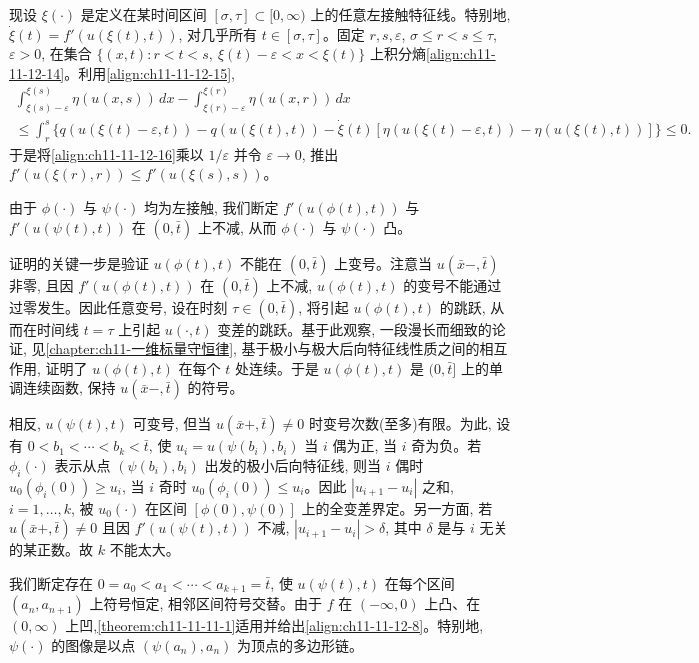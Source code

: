 \documentclass[../../main.tex]{subfiles}
\begin{document}
现设 $\xi(\cdot)$ 是定义在某时间区间 $[\sigma,\tau]\subset[0,\infty)$ 上的任意左接触特征线。特别地, $\dot{\xi}(t)=f'(u(\xi(t),t))$, 对几乎所有 $t\in[\sigma,\tau]$。固定 $r,s,\varepsilon$, $\sigma\leqslant r<s\leqslant\tau$, $\varepsilon>0$, 在集合 $\{(x,t):r<t<s,\ \xi(t)-\varepsilon<x<\xi(t)\}$ 上积分熵\eqref{align:ch11-11-12-14}。利用\eqref{align:ch11-11-12-15},
\begin{align}
\int_{\xi(s)-\varepsilon}^{\xi(s)}\eta(u(x,s))\,dx-\int_{\xi(r)-\varepsilon}^{\xi(r)}\eta(u(x,r))\,dx\nonumber\\
\leqslant\int_r^s\{q(u(\xi(t)-\varepsilon,t))-q(u(\xi(t),t))-\dot{\xi}(t)[\eta(u(\xi(t)-\varepsilon,t))-\eta(u(\xi(t),t))]\}\leqslant0.\label{align:ch11-11-12-16}
\end{align}
于是将\eqref{align:ch11-11-12-16}乘以 $1/\varepsilon$ 并令 $\varepsilon\to0$, 推出 $f'(u(\xi(r),r))\leqslant f'(u(\xi(s),s))$。

由于 $\phi(\cdot)$ 与 $\psi(\cdot)$ 均为左接触, 我们断定 $f'(u(\phi(t),t))$ 与 $f'(u(\psi(t),t))$ 在 $(0,\bar t)$ 上不减, 从而 $\phi(\cdot)$ 与 $\psi(\cdot)$ 凸。

证明的关键一步是验证 $u(\phi(t),t)$ 不能在 $(0,\bar t)$ 上变号。注意当 $u(\bar x-,\bar t)$ 非零, 且因 $f'(u(\phi(t),t))$ 在 $(0,\bar t)$ 上不减, $u(\phi(t),t)$ 的变号不能通过过零发生。因此任意变号, 设在时刻 $\tau\in(0,\bar t)$, 将引起 $u(\phi(t),t)$ 的跳跃, 从而在时间线 $t=\tau$ 上引起 $u(\cdot,t)$ 变差的跳跃。基于此观察, 一段漫长而细致的论证, 见\cref{chapter:ch11-一维标量守恒律}, 基于极小与极大后向特征线性质之间的相互作用, 证明了 $u(\phi(t),t)$ 在每个 $t$ 处连续。于是 $u(\phi(t),t)$ 是 $(0,\bar t]$ 上的单调连续函数, 保持 $u(\bar x-,\bar t)$ 的符号。


相反, $u(\psi(t),t)$ 可变号, 但当 $u(\bar x+,\bar t)\neq0$ 时变号次数(至多)有限。为此, 设有 $0<b_1<\cdots<b_k<\bar t$, 使 $u_i=u(\psi(b_i),b_i)$ 当 $i$ 偶为正, 当 $i$ 奇为负。若 $\phi_i(\cdot)$ 表示从点 $(\psi(b_i),b_i)$ 出发的极小后向特征线, 则当 $i$ 偶时 $u_0(\phi_i(0))\geqslant u_i$, 当 $i$ 奇时 $u_0(\phi_i(0))\leqslant u_i$。因此 $|u_{i+1}-u_i|$ 之和, $i=1,\ldots,k$, 被 $u_0(\cdot)$ 在区间 $[\phi(0),\psi(0)]$ 上的全变差界定。另一方面, 若 $u(\bar x+,\bar t)\neq0$ 且因 $f'(u(\psi(t),t))$ 不减, $|u_{i+1}-u_i|>\delta$, 其中 $\delta$ 是与 $i$ 无关的某正数。故 $k$ 不能太大。

我们断定存在 $0=a_0<a_1<\cdots<a_{k+1}=\bar t$, 使 $u(\psi(t),t)$ 在每个区间 $(a_n,a_{n+1})$ 上符号恒定, 相邻区间符号交替。由于 $f$ 在 $(-\infty,0)$ 上凸、在 $(0,\infty)$ 上凹,\cref{theorem:ch11-11-11-1}适用并给出\eqref{align:ch11-11-12-8}。特别地, $\psi(\cdot)$ 的图像是以点 $(\psi(a_n),a_n)$ 为顶点的多边形链。
\end{document}

